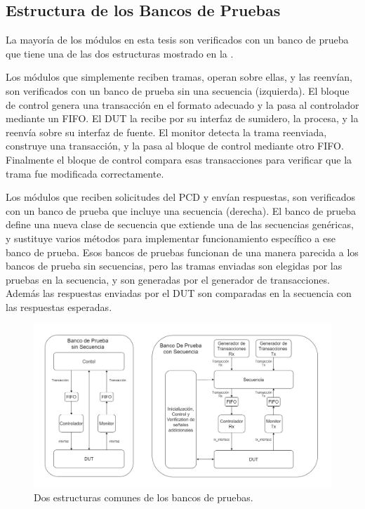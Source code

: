\documentclass[a4paper, twoside, 11pt]{report}
\begin{document}
\FloatBarrier
\subsection{Estructura de los Bancos de Pruebas}

La mayoría de los módulos en esta tesis son verificados con un banco de prueba que tiene una de las dos estructuras mostrado en la .

Los módulos que simplemente reciben tramas, operan sobre ellas, y las reenvían, son verificados con un banco de prueba sin una secuencia (izquierda). El bloque de control genera una transacción en el formato adecuado y la pasa al controlador mediante un FIFO. El DUT la recibe por su interfaz de sumidero, la procesa, y la reenvía sobre su interfaz de fuente. El monitor detecta la trama reenviada, construye una transacción, y la pasa al bloque de control mediante otro FIFO. Finalmente el bloque de control compara esas transacciones para verificar que la trama fue modificada correctamente.

Los módulos que reciben solicitudes del PCD y envían respuestas, son verificados con un banco de prueba que incluye una secuencia (derecha). El banco de prueba define una nueva clase de secuencia que extiende una de las secuencias genéricas, y sustituye varios métodos para implementar funcionamiento específico a ese banco de prueba. Esos bancos de pruebas funcionan de una manera parecida a los bancos de prueba sin secuencias, pero las tramas enviadas son elegidas por las pruebas en la secuencia, y son generadas por el generador de transacciones. Además las respuestas enviadas por el DUT son comparadas en la secuencia con las respuestas esperadas.

\begin{figure}[htb]
  \centering
  \includegraphics[width=1.0\textwidth]{./img/verification3}
  \caption{Dos estructuras comunes de los bancos de pruebas.}
  \label{fig:tb_structures}
\end{figure}
\end{document}
